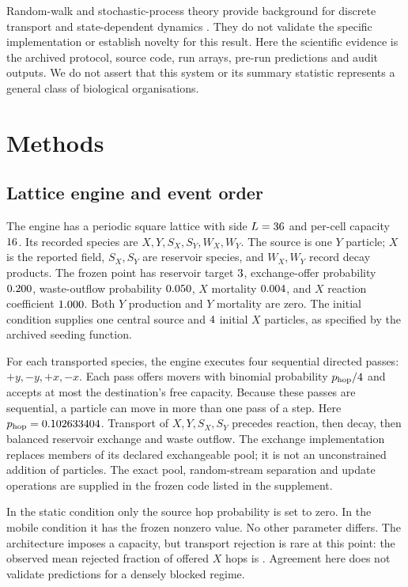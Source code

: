 \documentclass[11pt]{article}
\begin{document}
Random-walk and stochastic-process theory provide background for discrete transport and
state-dependent dynamics \citep{spitzer1976,gardiner2009}. They do not validate the specific
implementation or establish novelty for this result. Here the scientific evidence is the
archived protocol, source code, run arrays, pre-run predictions and audit outputs.
We do not assert that this system or its summary statistic represents a general class of
biological organisations.

\section{Methods}
\subsection{Lattice engine and event order}
The engine has a periodic square lattice with side $L=36$ and per-cell capacity
$16$. Its recorded species are $X,Y,S_X,S_Y,W_X,W_Y$.
The source is one $Y$ particle; $X$ is the reported field, $S_X,S_Y$ are reservoir species,
and $W_X,W_Y$ record decay products.
The frozen point has reservoir target $3$, exchange-offer probability
$0.200$, waste-outflow probability $0.050$, $X$ mortality $0.004$,
and $X$ reaction coefficient $1.000$. Both $Y$ production and $Y$ mortality are zero.
The initial condition supplies one central source and $4$ initial $X$ particles,
as specified by the archived seeding function.

For each transported species, the engine executes four sequential directed passes:
$+y,-y,+x,-x$. Each pass offers movers with binomial probability $p_{\rm hop}/4$ and accepts
at most the destination's free capacity. Because these passes are sequential, a particle can
move in more than one pass of a step. Here $p_{\rm hop}=0.102633404$.
Transport of $X,Y,S_X,S_Y$ precedes reaction, then decay, then balanced reservoir exchange
and waste outflow. The exchange implementation replaces members of its declared exchangeable
pool; it is not an unconstrained addition of particles. The exact pool, random-stream
separation and update operations are supplied in the frozen code listed in the supplement.

In the static condition only the source hop probability is set to zero. In the mobile
condition it has the frozen nonzero value. No other parameter differs. The architecture
imposes a capacity, but transport rejection is rare at this point: the observed mean rejected
fraction of offered $X$ hops is \VBlockedMean. Agreement here does not validate predictions
for a densely blocked regime.
\end{document}
